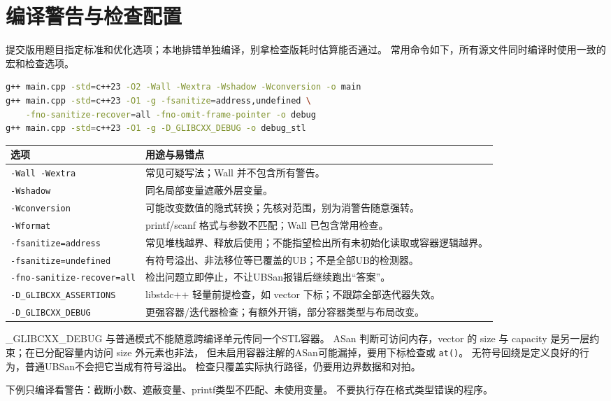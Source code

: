 \section{编译警告与检查配置}
提交版用题目指定标准和优化选项；本地排错单独编译，别拿检查版耗时估算能否通过。
常用命令如下，所有源文件同时编译时使用一致的宏和检查选项。
\begin{lstlisting}[language=bash]
g++ main.cpp -std=c++23 -O2 -Wall -Wextra -Wshadow -Wconversion -o main
g++ main.cpp -std=c++23 -O1 -g -fsanitize=address,undefined \
    -fno-sanitize-recover=all -fno-omit-frame-pointer -o debug
g++ main.cpp -std=c++23 -O1 -g -D_GLIBCXX_DEBUG -o debug_stl
\end{lstlisting}
\begin{longtable}{p{54mm}p{105mm}}\toprule 选项 & 用途与易错点\\\midrule\endhead
\texttt{-Wall -Wextra} & 常见可疑写法；Wall 并不包含所有警告。\\
\texttt{-Wshadow} & 同名局部变量遮蔽外层变量。\\
\texttt{-Wconversion} & 可能改变数值的隐式转换；先核对范围，别为消警告随意强转。\\
\texttt{-Wformat} & printf/scanf 格式与参数不匹配；Wall 已包含常用检查。\\
\texttt{-fsanitize=address} & 常见堆栈越界、释放后使用；不能指望检出所有未初始化读取或容器逻辑越界。\\
\texttt{-fsanitize=undefined} & 有符号溢出、非法移位等已覆盖的UB；不是全部UB的检测器。\\
\texttt{-fno-sanitize-recover=all} & 检出问题立即停止，不让UBSan报错后继续跑出“答案”。\\
\texttt{-D\_GLIBCXX\_ASSERTIONS} & libstdc++ 轻量前提检查，如 vector 下标；不跟踪全部迭代器失效。\\
\texttt{-D\_GLIBCXX\_DEBUG} & 更强容器/迭代器检查；有额外开销，部分容器类型与布局改变。\\\bottomrule
\end{longtable}
\_GLIBCXX\_DEBUG 与普通模式不能随意跨编译单元传同一个STL容器。
ASan 判断可访问内存，vector 的 size 与 capacity 是另一层约束；在已分配容量内访问 size 外元素也非法，
但未启用容器注解的ASan可能漏掉，要用下标检查或 \texttt{at()}。
无符号回绕是定义良好的行为，普通UBSan不会把它当成有符号溢出。
检查只覆盖实际执行路径，仍要用边界数据和对拍。

下例只编译看警告：截断小数、遮蔽变量、printf类型不匹配、未使用变量。
不要执行存在格式类型错误的程序。


